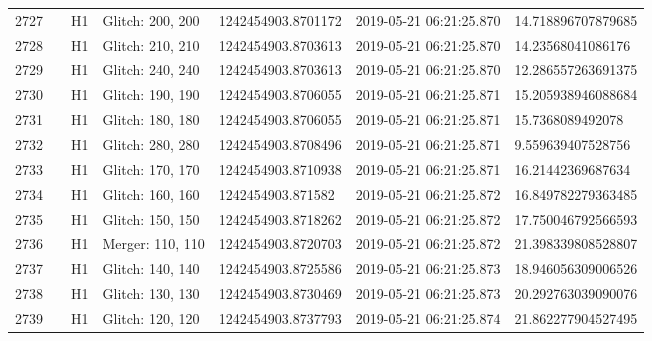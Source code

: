 \begin{longtable}{lllllll}
2727 &                                                    &       H1 &  Glitch: 200, 200 &  1242454903.8701172 &  2019-05-21 06:21:25.870 &  14.718896707879685 \\
2728 &                                                    &       H1 &  Glitch: 210, 210 &  1242454903.8703613 &  2019-05-21 06:21:25.870 &   14.23568041086176 \\
2729 &                                                    &       H1 &  Glitch: 240, 240 &  1242454903.8703613 &  2019-05-21 06:21:25.870 &  12.286557263691375 \\
2730 &                                                    &       H1 &  Glitch: 190, 190 &  1242454903.8706055 &  2019-05-21 06:21:25.871 &  15.205938946088684 \\
2731 &                                                    &       H1 &  Glitch: 180, 180 &  1242454903.8706055 &  2019-05-21 06:21:25.871 &    15.7368089492078 \\
2732 &                                                    &       H1 &  Glitch: 280, 280 &  1242454903.8708496 &  2019-05-21 06:21:25.871 &   9.559639407528756 \\
2733 &                                                    &       H1 &  Glitch: 170, 170 &  1242454903.8710938 &  2019-05-21 06:21:25.871 &   16.21442369687634 \\
2734 &                                                    &       H1 &  Glitch: 160, 160 &   1242454903.871582 &  2019-05-21 06:21:25.872 &  16.849782279363485 \\
2735 &                                                    &       H1 &  Glitch: 150, 150 &  1242454903.8718262 &  2019-05-21 06:21:25.872 &  17.750046792566593 \\
2736 &                                                    &       H1 &  Merger: 110, 110 &  1242454903.8720703 &  2019-05-21 06:21:25.872 &  21.398339808528807 \\
2737 &                                                    &       H1 &  Glitch: 140, 140 &  1242454903.8725586 &  2019-05-21 06:21:25.873 &  18.946056309006526 \\
2738 &                                                    &       H1 &  Glitch: 130, 130 &  1242454903.8730469 &  2019-05-21 06:21:25.873 &  20.292763039090076 \\
2739 &                                                    &       H1 &  Glitch: 120, 120 &  1242454903.8737793 &  2019-05-21 06:21:25.874 &  21.862277904527495 \\

\end{longtable}
